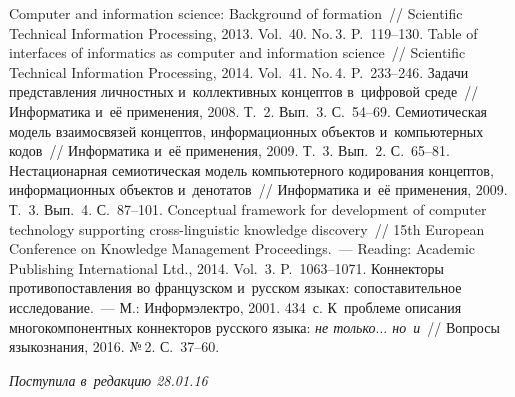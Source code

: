 \begin{multicols}{2}
{{\begin{thebibliography}{99}
 Computer and information science: Background of formation~// 
Scientific   Technical Information Processing, 2013. Vol.~40. No.\,3. P.~119--130.
 Table of interfaces of informatics as computer and information science~// 
Scientific Technical Information Processing, 2014. Vol.~41. No.\,4. P.~233--246.
 Задачи представления личностных 
и~коллективных концептов в~цифровой среде~// Информатика и~её применения, 2008. 
Т.~2. Вып.~3. С.~54--69.
 Семиотическая модель взаимосвязей концептов, информационных 
объектов и~компьютерных кодов~// Информатика и~её применения, 2009. Т.~3. Вып.~2. 
С.~65--81.
 Нестационарная семиотическая модель компьютерного кодирования 
концептов, информационных объектов и~денотатов~// Информатика и~её применения, 
2009. Т.~3. Вып.~4. С.~87--101.
 Conceptual 
framework for development of computer technology supporting cross-linguistic knowledge 
discovery~// 15th European Conference on Knowledge Management Proceedings.~--- Reading: 
Academic Publishing International Ltd., 2014. Vol.~3. P.~1063--1071.
 Коннекторы противопоставления во французском 
и~русском языках: сопоставительное исследование.~---  М.: Информэлектро, 2001. 434~с.
 К~проблеме описания многокомпонентных коннекторов русского 
языка: \textit{не только$\ldots$ но~и}~// Вопросы языкознания, 2016. №\,2. С.~37--60.
\end{thebibliography}

 }
 }

\end{multicols}

\vspace*{-3pt}

\hfill{\small\textit{Поступила в~редакцию 28.01.16}}


\newpage

\vspace*{-24pt}







